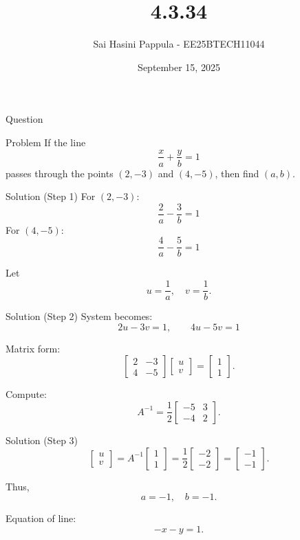 \documentclass{beamer}
\title %
{4.3.34}
\date{September 15, 2025}
\author %
{Sai Hasini Pappula - EE25BTECH11044}
\begin{document}
\begin{frame}{Question}
\begin{block}{Problem}
If the line
\[
\frac{x}{a} + \frac{y}{b} = 1
\]
passes through the points $(2,-3)$ and $(4,-5)$, then find $(a,b)$.
\end{block}
\end{frame}

\begin{frame}{Solution (Step 1)}
For $(2,-3)$:
\[
\frac{2}{a} - \frac{3}{b} = 1
\]
For $(4,-5)$:
\[
\frac{4}{a} - \frac{5}{b} = 1
\]

Let
\[
u = \frac{1}{a}, \quad v = \frac{1}{b}.
\]
\end{frame}

\begin{frame}{Solution (Step 2)}
System becomes:
\[
2u - 3v = 1, \qquad 4u - 5v = 1
\]

Matrix form:
\[
\begin{bmatrix}2 & -3 \\ 4 & -5 \end{bmatrix}
\begin{bmatrix}u \\ v\end{bmatrix}
=
\begin{bmatrix}1 \\ 1\end{bmatrix}.
\]

Compute:
\[
A^{-1} = \frac{1}{2}
\begin{bmatrix}-5 & 3 \\ -4 & 2\end{bmatrix}.
\]
\end{frame}

\begin{frame}{Solution (Step 3)}
\[
\begin{bmatrix}u \\ v\end{bmatrix}
=
A^{-1}\begin{bmatrix}1 \\ 1\end{bmatrix}
=
\frac{1}{2}\begin{bmatrix}-2 \\ -2\end{bmatrix}
=
\begin{bmatrix}-1 \\ -1\end{bmatrix}.
\]

Thus,
\[
a = -1, \quad b = -1.
\]

Equation of line:
\[
-x - y = 1.
\]
\end{frame}
\end{document}
